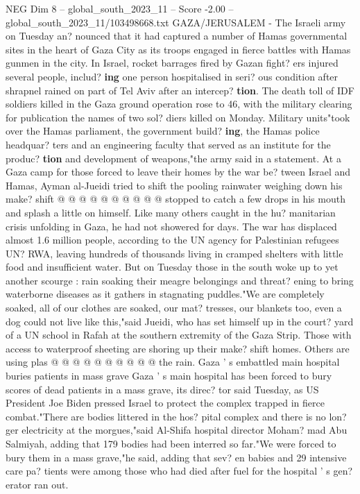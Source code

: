 \begin{textsample}{NEG Dim 8 – global\_south\_2023\_11 – Score -2.00 – global\_south\_2023\_11/103498668.txt}  \label{ex:f8_neg_079}
GAZA/JERUSALEM - The Israeli army on Tuesday an? nounced that it had captured a number of Hamas governmental sites in the heart of Gaza City as its troops engaged in fierce battles with Hamas gunmen in the city.
In Israel, rocket barrages fired by Gazan fight? ers injured several people, includ? \textbf{ing} one person hospitalised in seri? ous condition after shrapnel rained on part of Tel Aviv after an intercep? \textbf{tion}.
The death toll of IDF soldiers killed in the Gaza ground operation rose to 46, with the military clearing for publication the names of two sol? diers killed on Monday.
Military units"took over the Hamas parliament, the government build? \textbf{ing}, the Hamas police headquar? ters and an engineering faculty that served as an institute for the produc? \textbf{tion} and development of weapons,"the army said in a statement.
At a Gaza camp for those forced to leave their homes by the war be? tween Israel and Hamas, Ayman al-Jueidi tried to shift the pooling rainwater weighing down his make? shift @ @ @ @ @ @ @ @ @ @ stopped to catch a few drops in his mouth and splash a little on himself.
Like many others caught in the hu? manitarian crisis unfolding in Gaza, he had not showered for days.
The war has displaced almost 1.6 million people, according to the UN agency for Palestinian refugees UN?
RWA, leaving hundreds of thousands living in cramped shelters with little food and insufficient water.
But on Tuesday those in the south woke up to yet another scourge : rain soaking their meagre belongings and threat? ening to bring waterborne diseases as it gathers in stagnating puddles."We are completely soaked, all of our clothes are soaked, our mat? tresses, our blankets too, even a dog could not live like this,"said Jueidi, who has set himself up in the court? yard of a UN school in Rafah at the southern extremity of the Gaza Strip.
Those with access to waterproof sheeting are shoring up their make? shift homes.
Others are using plas @ @ @ @ @ @ @ @ @ @ the rain.
Gaza ' s embattled main hospital buries patients in mass grave Gaza ' s main hospital has been forced to bury scores of dead patients in a mass grave, its direc? tor said Tuesday, as US President Joe Biden pressed Israel to protect the complex trapped in fierce combat."There are bodies littered in the hos? pital complex and there is no lon? ger electricity at the morgues,"said Al-Shifa hospital director Moham? mad Abu Salmiyah, adding that 179 bodies had been interred so far."We were forced to bury them in a mass grave,"he said, adding that sev? en babies and 29 intensive care pa? tients were among those who had died after fuel for the hospital ' s gen? erator ran out.

\end{textsample}
